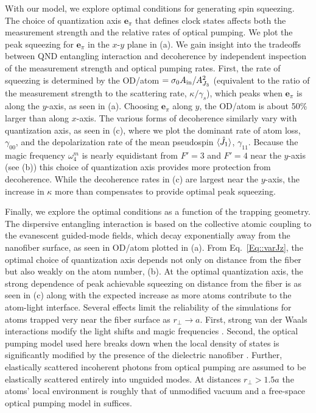 \documentclass[preprint, aps,pra,onecolumn]{revtex4-1} %
\newcommand{\jx}{\hat{J}_1}
\newcommand{\qaxis}{\mathbf{e}_\pi}
\newcommand{\magic}[1]{\omega_{#1}^m}
\begin{document}
With our model, we explore optimal conditions for generating spin squeezing.  
The choice of quantization axis $\qaxis$ that defines clock states affects both the measurement strength and the relative rates of optical pumping. 
We plot the peak squeezing for $\qaxis$ in the $x$-$y$ plane in (a). 
We gain insight into the tradeoffs between QND entangling interaction and decoherence by independent inspection of the measurement strength and optical pumping rates.  
First, the rate of squeezing is determined by the OD/atom $=\sigma_0 A_{\rm in}/A_{J_3}^2$ (equivalent to the ratio of the measurement strength to the scattering rate, $\kappa/\gamma_s$), which peaks when $\qaxis$ is along the $y$-axis, as seen in (a). 
Choosing $\qaxis$ along $y$, the OD/atom is about 50\% larger than along $x$-axis.  
The various forms of decoherence similarly vary with quantization axis, as seen in (c), where we plot the dominant rate of atom loss, $\gamma_{00}$, and the depolarization rate of the mean pseudospin $\expt{\jx}$, $\gamma_{11}$. 
Because the magic frequency $\magic{4}$ is nearly equidistant from $F'=3$ and $F'=4$ near the $y$-axis (see (b)) this choice of quantization axis provides more protection from decoherence.   
While the decoherence rates in (c) are largest near the $y$-axis, the increase in $\kappa$ more than compensates to provide optimal peak squeezing.

Finally, we explore the optimal conditions as a function of the trapping geometry.  
The dispersive entangling interaction is based on the collective atomic coupling to the evanescent guided-mode fields, which decay exponentially away from the nanofiber surface, as seen in OD/atom plotted in (a). 
From Eq.~\eqref{Eq::varJz}, the optimal choice of quantization axis depends not only on distance from the fiber but also weakly on the atom number, (b).  
At the optimal quantization axis, the strong dependence of peak achievable squeezing on distance from the fiber is as seen in (c) along with the expected increase as more atoms contribute to the atom-light interface.  
Several effects limit the reliability of the simulations for atoms trapped very near the fiber surface as $r_\perp \rightarrow a$. 
First, strong van der Waals interactions modify the light shifts and magic frequencies \cite{vetsch_eugen_optical_2010, lacroute_state-insensitive_2012}.  
Second, the optical pumping model used here breaks down when the local density of states is significantly modified by the presence of the dielectric nanofiber \cite{le_kien_spontaneous_2005, le_kien_scattering_2006}. 
Further, elastically scattered incoherent photons from optical pumping are assumed to be elastically scattered entirely into unguided modes.  At distances $r_\perp > 1.5a$ the atoms' local environment is roughly that of unmodified vacuum \cite{le_kien_spontaneous_2005} and a free-space optical pumping model in  suffices. 
\end{document}
